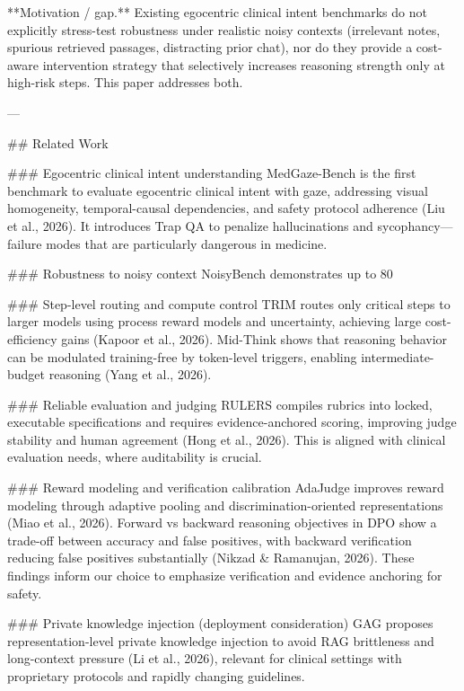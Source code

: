 **Motivation / gap.** Existing egocentric clinical intent benchmarks do not explicitly stress-test robustness under realistic noisy contexts (irrelevant notes, spurious retrieved passages, distracting prior chat), nor do they provide a cost-aware intervention strategy that selectively increases reasoning strength only at high-risk steps. This paper addresses both.

---

## Related Work  

### Egocentric clinical intent understanding  
MedGaze-Bench is the first benchmark to evaluate egocentric clinical intent with gaze, addressing visual homogeneity, temporal-causal dependencies, and safety protocol adherence (Liu et al., 2026). It introduces Trap QA to penalize hallucinations and sycophancy—failure modes that are particularly dangerous in medicine.

### Robustness to noisy context  
NoisyBench demonstrates up to 80%

### Step-level routing and compute control  
TRIM routes only critical steps to larger models using process reward models and uncertainty, achieving large cost-efficiency gains (Kapoor et al., 2026). Mid-Think shows that reasoning behavior can be modulated training-free by token-level triggers, enabling intermediate-budget reasoning (Yang et al., 2026).

### Reliable evaluation and judging  
RULERS compiles rubrics into locked, executable specifications and requires evidence-anchored scoring, improving judge stability and human agreement (Hong et al., 2026). This is aligned with clinical evaluation needs, where auditability is crucial.

### Reward modeling and verification calibration  
AdaJudge improves reward modeling through adaptive pooling and discrimination-oriented representations (Miao et al., 2026). Forward vs backward reasoning objectives in DPO show a trade-off between accuracy and false positives, with backward verification reducing false positives substantially (Nikzad & Ramanujan, 2026). These findings inform our choice to emphasize verification and evidence anchoring for safety.

### Private knowledge injection (deployment consideration)  
GAG proposes representation-level private knowledge injection to avoid RAG brittleness and long-context pressure (Li et al., 2026), relevant for clinical settings with proprietary protocols and rapidly changing guidelines.

